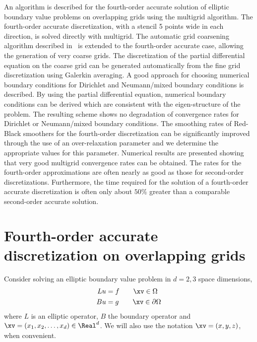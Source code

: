 \documentclass[12pt]{article}
\begin{document}
  An algorithm is described for the fourth-order accurate solution of elliptic boundary
value problems on overlapping grids using the multigrid algorithm. The
fourth-order accurate discretization, with a stencil 5 points wide in each
direction, is solved directly with multigrid. The automatic grid coarsening algorithm
described in~\cite{OnMultigrid} is extended to the fourth-order accurate case, allowing the
generation of very coarse grids.
%
The discretization of the partial differential equation on the
coarse grid can be generated automatically from the fine grid discretization
using Galerkin averaging.
%
A good approach for choosing numerical boundary conditions for Dirichlet and Neumann/mixed
boundary conditions is described. By using the partial differential equation, 
numerical boundary conditions
can be derived which are consistent with the eigen-structure of the problem.
The resulting scheme shows no degradation of convergence rates for Dirichlet or Neumann/mixed
boundary conditions.
%
The smoothing rates of Red-Black smoothers for the fourth-order discretization
can be significantly improved through
the use of an over-relaxation parameter and we determine the appropriate values
for this parameter.
%
Numerical results are presented showing that very good multigrid convergence rates can be obtained. 
The rates for the fourth-order approximations are often nearly as
good as those for second-order discretizations. 
Furthermore, the time required for the solution of a fourth-order accurate discretization 
is often only about $50\%$ greater than a comparable second-order accurate solution.

\section{Fourth-order accurate discretization on overlapping grids}

Consider solving an elliptic boundary value problem in $d=2,3$ space dimensions,
\begin{align*}
  L u & = f \qquad \xv\in\Omega \\
  B u & = g \qquad \xv\in\partial\Omega
\end{align*}
where $L$ is an elliptic operator, $B$ the boundary operator and $\xv=(x_1,x_2,\ldots,x_d)\in \Real^d$.
We will also use the notation $\xv=(x,y,z)$, when convenient.
\end{document}

